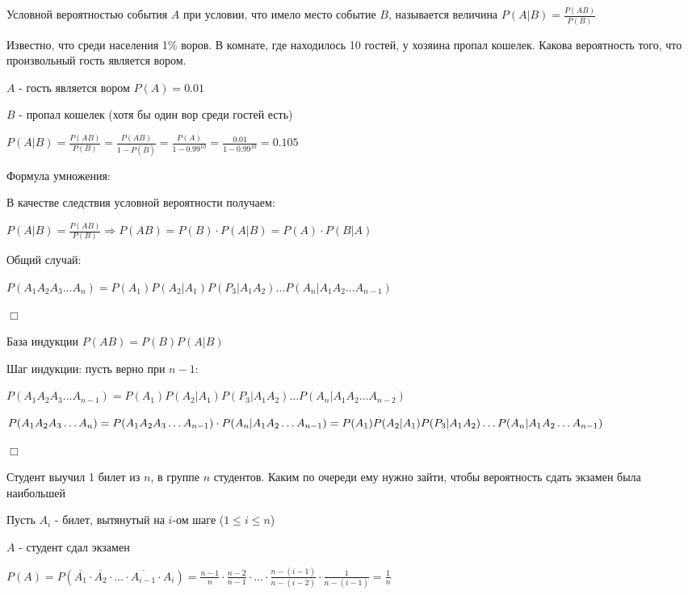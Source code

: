\documentclass[12pt]{article}
\begin{document}
    \Def Условной вероятностью события $A$ при условии, что имело место событие $B$, называется величина $P(A|B) = \frac{P(AB)}{P(B)}$

    \Ex Известно, что среди населения 1\% воров. В комнате, где находилось 10 гостей, у хозяина пропал кошелек. Какова вероятность того, что произвольный гость является вором.

    $A$ - гость является вором $P(A) = 0.01$

    $B$ - пропал кошелек (хотя бы один вор среди гостей есть)

    $P(A|B) = \frac{P(AB)}{P(B)} = \frac{P(AB)}{1 - P(\overline{B})} = \frac{P(A)}{1 - 0.99^{10}} = \frac{0.01}{1 - 0.99^{10}} = 0.105$

    Формула умножения:

    В качестве следствия условной вероятности получаем:

    $P(A|B) = \frac{P(AB)}{P(B)} \Longrightarrow P(AB) = P(B) \cdot P(A|B) = P(A) \cdot P(B|A)$

    Общий случай:

    $P(A_1 A_2 A_3 \dots A_n) = P(A_1) P(A_2 | A_1) P(P_3 | A_1 A_2) \dots P(A_n | A_1 A_2 \dots A_{n - 1})$

    \begin{tcolorbox}
        $\Box$

        База индукции $P(AB) = P(B) P(A|B)$

        Шаг индукции: пусть верно при $n - 1$:

        $P(A_1 A_2 A_3 \dots A_{n - 1}) = P(A_1) P(A_2 | A_1) P(P_3 | A_1 A_2) \dots P(A_n | A_1 A_2 \dots A_{n - 2})$

        $P(A_1 A_2 A_3 \dots A_n) = P(A_1 A_2 A_3 \dots A_{n - 1}) \cdot P(A_n | A_1 A_2 \dots A_{n - 1}) = \\
        P(A_1) P(A_2 | A_1) P(P_3 | A_1 A_2) \dots P(A_n | A_1 A_2 \dots A_{n - 1})$

        $\Box$
    \end{tcolorbox}


    \Ex Студент выучил 1 билет из $n$, в группе $n$ студентов. Каким по очереди ему нужно зайти, чтобы вероятность сдать экзамен была наибольшей

    Пусть $A_i$ - билет, вытянутый на $i$-ом шаге ($1 \leq i \leq n$)

    $A$ - студент сдал экзамен

    $P(A) = P(\overline{A_1} \cdot \overline{A_2} \cdot \dots \cdot \overline{A_{i - 1}} \cdot A_i) = \frac{n - 1}{n} \cdot \frac{n - 2}{n - 1} \cdot \dots \cdot \frac{n - (i - 1)}{n - (i - 2)} \cdot \frac{1}{n - (i - 1)} = \frac{1}{n}$
\end{document}
